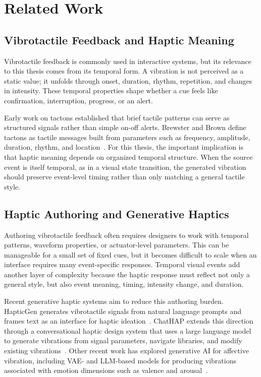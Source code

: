 \chapter{Related Work}

\section{Vibrotactile Feedback and Haptic Meaning}

Vibrotactile feedback is commonly used in interactive systems, but its relevance to this thesis comes from its temporal form. A vibration is not perceived as a static value; it unfolds through onset, duration, rhythm, repetition, and changes in intensity. These temporal properties shape whether a cue feels like confirmation, interruption, progress, or an alert.

Early work on tactons established that brief tactile patterns can serve as structured signals rather than simple on-off alerts. Brewster and Brown define tactons as tactile messages built from parameters such as frequency, amplitude, duration, rhythm, and location~\cite{brewster2004tactons}. For this thesis, the important implication is that haptic meaning depends on organized temporal structure. When the source event is itself temporal, as in a visual state transition, the generated vibration should preserve event-level timing rather than only matching a general tactile style.

\section{Haptic Authoring and Generative Haptics}

Authoring vibrotactile feedback often requires designers to work with temporal patterns, waveform properties, or actuator-level parameters. This can be manageable for a small set of fixed cues, but it becomes difficult to scale when an interface requires many event-specific responses. Temporal visual events add another layer of complexity because the haptic response must reflect not only a general style, but also event meaning, timing, intensity change, and duration.

Recent generative haptic systems aim to reduce this authoring burden. HapticGen generates vibrotactile signals from natural language prompts and frames text as an interface for haptic ideation~\cite{sung2025hapticgen}. ChatHAP extends this direction through a conversational haptic design system that uses a large language model to generate vibrations from signal parameters, navigate libraries, and modify existing vibrations~\cite{lim2025chathap}. Other recent work has explored generative AI for affective vibration, including VAE- and LLM-based models for producing vibrations associated with emotion dimensions such as valence and arousal~\cite{li2025affectivevibration}.

